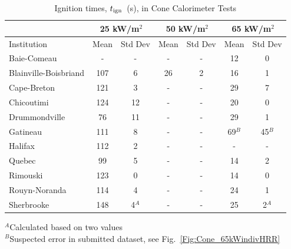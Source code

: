 \documentclass{book}
\begin{document}
\begin{table}[ht]
\caption{Ignition times, $t_{\rm ign}$~(s), in Cone Calorimeter Tests}
\label{Table_12}
\begin{center}
\begin{tabular}{|l|cc|cc|cc|}
\hline
                         & \multicolumn{2}{|c|}{25 kW/m$^2$} &  \multicolumn{2}{|c|}{50 kW/m$^2$} & \multicolumn{2}{|c|}{65 kW/m$^2$}    \\ \hline
Institution              & Mean     & Std Dev                & Mean      & Std Dev                & Mean     & Std Dev                   \\ \hline
Baie-Comeau              & -        & -                      & -         & -                      & 12       & 0                         \\
Blainville-Boisbriand    & 107      & 6                      & 26        & 2                      & 16       & 1                         \\
Cape-Breton              & 121      & 3                      & -         & -                      & 29       & 7                         \\
Chicoutimi               & 124      & 12                     & -         & -                      & 20       & 0                         \\
Drummondville            & 76       & 11                     & -         & -                      & 29       & 1                         \\
Gatineau                 & 111      & 8                      & -         & -                      & 69$^B$   & 45$^B$                    \\
Halifax                  & 112      & 2                      & -         & -                      & -        & -                         \\
Quebec                   & 99       & 5                      & -         & -                      & 14       & 2                         \\
Rimouski                 & 123      & 0                      & -         & -                      & 14       & 0                         \\
Rouyn-Noranda            & 114      & 4                      & -         & -                      & 24       & 1                         \\
Sherbrooke               & 148      & 4$^A$                  & -         & -                      & 25       & 2$^A$                     \\ \hline
\end{tabular}
\end{center}
$^A$Calculated based on two values     \\
$^B$Suspected error in submitted dataset, see Fig.~\ref{Fig:Cone_65kWindivHRR}
\end{table}
\end{document}

